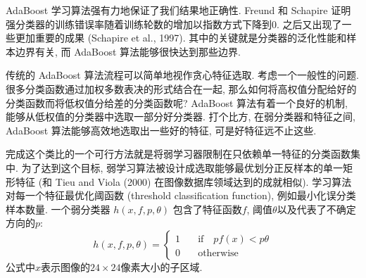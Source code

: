 \documentclass[utf8]{ctexart}
\begin{document}
AdaBoost 学习算法强有力地保证了我们结果地正确性. Freund 和 Schapire 证明强分类器的训练错误率随着训练轮数的增加以指数方式下降到$0$. 之后又出现了一些更加重要的成果 (Schapire et al., 1997). 其中的关键就是分类器的泛化性能和样本边界有关, 而 AdaBoost 算法能够很快达到那些边界.

传统的 AdaBoost 算法流程可以简单地视作贪心特征选取. 考虑一个一般性的问题. 很多分类函数通过加权多数表决的形式结合在一起, 那么如何将高权值分配给好的分类函数而将低权值分给差的分类函数呢? 
AdaBoost 算法有着一个良好的机制, 能够从低权值的分类器中选取一部分好分类器. 打个比方, 在弱分类器和特征之间, AdaBoost 算法能够高效地选取出一些好的特征, 可是好特征远不止这些.

完成这个类比的一个可行方法就是将弱学习器限制在只依赖单一特征的分类函数集中. 为了达到这个目标, 弱学习算法被设计成选取能够最优划分正反样本的单一矩形特征 (和 Tieu and Viola (2000) 在图像数据库领域达到的成就相似). 学习算法对每一个特征最优化阈函数 (threshold classification function), 例如最小化误分类样本数量. 一个弱分类器 $h(x,f,p,\theta)$ 包含了特征函数$f$, 阈值$\theta$以及代表了不确定方向的$p$:
\[
    h(x,f,p,\theta) =
    \begin{cases}
        1 &\quad\text{if}\quad pf(x)<p\theta \\
        0 &\quad\text{otherwise}
    \end{cases}
\]
公式中$x$表示图像的$24\times24$像素大小的子区域.
\end{document}
